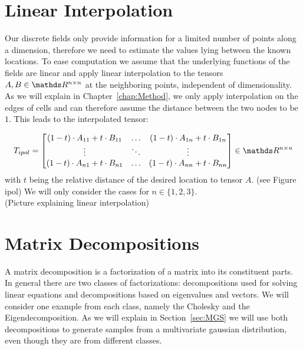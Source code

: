 \section{Linear Interpolation}

Our discrete fields only provide information for a limited number of
points along a dimension, therefore we need to estimate the values lying
between the known locations. To ease computation we assume that the
underlying functions of the fields are linear and apply linear
interpolation to the tensors $A, B \in \real^{n \times n}$ at the
neighboring points, independent of dimensionality. As we will explain in
Chapter~\ref{chap:Method}, we only apply interpolation on the edges of
cells and can therefore assume the distance between the two nodes to be
$1$. This leads to the interpolated tensor:

\begin{equation}
  T_{ipol} =
  \begin{bmatrix}
    (1-t) \cdot A_{11} + t \cdot B_{11} & \dots & (1-t) \cdot A_{1n} + t \cdot B_{1n} \\
    \vdots & \ddots & \vdots \\
    (1-t) \cdot A_{n1} + t \cdot B_{n1} & \dots & (1-t) \cdot A_{nn} + t \cdot B_{nn} \\
  \end{bmatrix}
  \in \real^{n \times n}
\end{equation}
with $t$ being the relative distance of the desired location to tensor
$A$. (see Figure ipol) We will only consider the cases for $n \in
\{1,2,3\}$.
\\(Picture explaining linear interpolation)

\section{Matrix Decompositions}

A matrix decomposition is a factorization of a matrix into its
constituent parts. In general there are two classes of factorizations:
decompositions used for solving linear equations and decompositions
based on eigenvalues and vectors. We will consider one example from each
class, namely the Cholesky and the Eigendecomposition. As we will
explain in Section~\ref{sec:MGS} we will use both decompositions to
generate samples from a multivariate gaussian distribution, even though
they are from different classes.

